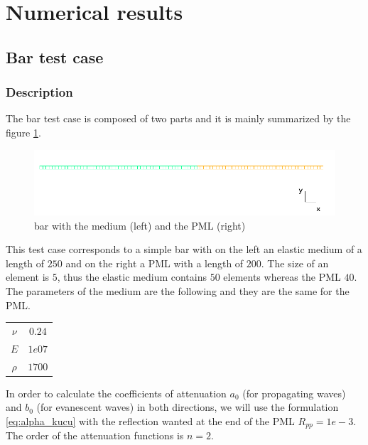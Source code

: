 \section{Numerical results}
\subsection{Bar test case}
\subsubsection{Description}
The bar test case is composed of two parts and it is mainly summarized by the figure \ref{fig:bar}. 
\begin{figure}[H]
  \centering
  \includegraphics[scale=0.6]{images/bar.png}
  \caption{bar with the medium (left) and the PML (right)}
  \label{fig:bar}
\end{figure}  
This test case corresponds to a simple bar with on the left an elastic medium of a length of $250$ and on the right a PML with a length of $200$. The size of an element is $5$, thus the elastic medium contains $50$ elements whereas the PML $40$. The parameters of the medium are the following and they are the same for the PML.
\begin{table}[H]
\centering
\begin{tabular}{c|c}
$\nu$ & $0.24$ \\
$E$ & $1e07$ \\
$\rho$ & $1700$ \\
\end{tabular}
\end{table} 
In order to calculate the coefficients of attenuation $a_0$ (for propagating waves) and $b_0$ (for evanescent waves) in both directions, we will use the formulation \ref{eq:alpha_kucu} with the reflection wanted at the end of the PML $R_{pp} = 1e-3$. The order of the attenuation functions is $n = 2$. \\
